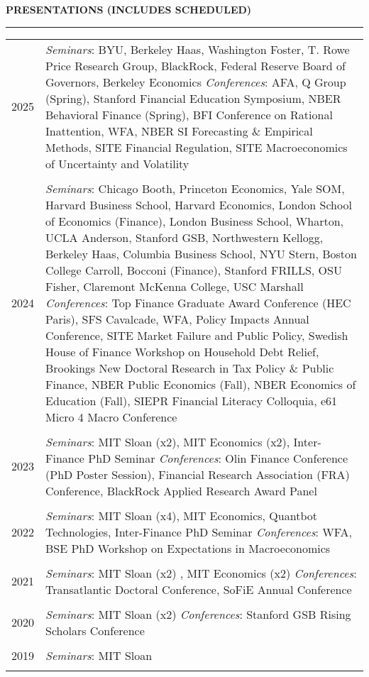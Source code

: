 \documentclass[a4paper, 10pt]{article}
\newcommand{\cvsec}[1]
{
	\needspace{2\baselineskip}
	\noindent \textbf{#1}
	
	\vspace{2pt}
	
	\hrule
	
	\bigskip
}
\newcommand{\cvitem}[2]{#1 & #2 \\ & \\}
\newenvironment{cvchrono}[1]
{
	\cvsec{#1}
	\begin{tabu} to \linewidth {X[1,l]X[6,l]} 
}
{
	\end{tabu}
}
\begin{document}
\begin{cvchrono}{PRESENTATIONS (INCLUDES SCHEDULED)}
	\cvitem{2025}{\textit{Seminars}: BYU, Berkeley Haas, Washington Foster, T. Rowe Price Research Group, BlackRock, Federal Reserve Board of Governors, Berkeley Economics  \newline \textit{Conferences}: AFA, Q Group (Spring), Stanford Financial Education Symposium, NBER Behavioral Finance (Spring), BFI Conference on Rational Inattention, WFA, NBER SI Forecasting \& Empirical Methods, SITE Financial Regulation, SITE Macroeconomics of Uncertainty and Volatility}
	\cvitem{2024}{\textit{Seminars}: Chicago Booth, Princeton Economics, Yale SOM, Harvard Business School, Harvard Economics, London School of Economics (Finance), London Business School, Wharton, UCLA Anderson, Stanford GSB, Northwestern Kellogg, Berkeley Haas, Columbia Business School, NYU Stern, Boston College Carroll, Bocconi (Finance), Stanford FRILLS, OSU Fisher, Claremont McKenna College, USC Marshall \newline \textit{Conferences}: Top Finance Graduate Award Conference (HEC Paris), SFS Cavalcade, WFA, Policy Impacts Annual Conference, SITE Market Failure and Public Policy, Swedish House of Finance Workshop on Household Debt Relief, Brookings New Doctoral Research in Tax Policy \& Public Finance, NBER Public Economics (Fall), NBER Economics of Education (Fall), SIEPR Financial Literacy Colloquia, e61 Micro 4 Macro Conference}
	\cvitem{2023}{\textit{Seminars}: MIT Sloan (x2), MIT Economics (x2), Inter-Finance PhD Seminar \newline \textit{Conferences}: Olin Finance Conference (PhD Poster Session), Financial Research Association (FRA) Conference, BlackRock Applied Research Award Panel}
	\cvitem{2022}{\textit{Seminars}: MIT Sloan (x4), MIT Economics, Quantbot Technologies, Inter-Finance PhD Seminar \newline \textit{Conferences}: WFA, BSE PhD Workshop on Expectations in Macroeconomics}
	\cvitem{2021}{\textit{Seminars}: MIT Sloan (x2) , MIT Economics (x2) \newline \textit{Conferences}: Transatlantic Doctoral Conference, SoFiE Annual Conference}
	\cvitem{2020}{\textit{Seminars}: MIT Sloan (x2) \newline \textit{Conferences}: Stanford GSB Rising Scholars Conference}
	\cvitem{2019}{\textit{Seminars}: MIT Sloan}
\end{cvchrono}

\end{document}
